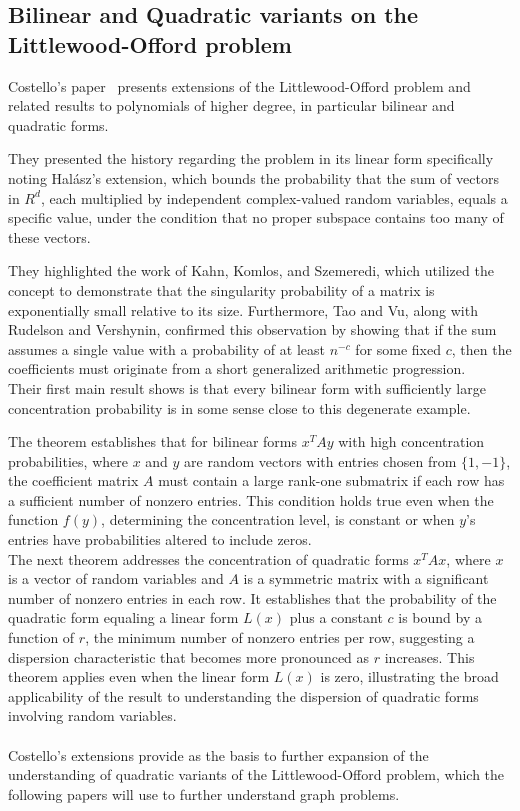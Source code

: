 \subsection{Bilinear and Quadratic variants on the Littlewood-Offord problem}

Costello's paper~\cite{costello2009bilinear} presents extensions of the Littlewood-Offord problem and related results to polynomials of higher degree, in particular bilinear and quadratic forms.

They presented the history regarding the problem in its linear form specifically noting Halász's extension, which bounds the probability that the sum of vectors in \(R^d\), each multiplied by independent complex-valued random variables, equals a specific value, under the condition that no proper subspace contains too many of these vectors.

They highlighted the work of Kahn, Komlos, and Szemeredi, which utilized the concept to demonstrate that the singularity probability of a matrix is exponentially small relative to its size. Furthermore, Tao and Vu, along with Rudelson and Vershynin, confirmed this observation by showing that if the sum assumes a single value with a probability of at least \(n^{-c}\) for some fixed \(c\), then the coefficients must originate from a short generalized arithmetic progression.\\

Their first main result shows is that every bilinear form with sufficiently large concentration probability is in some sense close to this degenerate example.

The theorem establishes that for bilinear forms \(x^T A y\) with high concentration probabilities, where \(x\) and \(y\) are random vectors with entries chosen from \(\{1, -1\}\), the coefficient matrix \(A\) must contain a large rank-one submatrix if each row has a sufficient number of nonzero entries. This condition holds true even when the function \(f(y)\), determining the concentration level, is constant or when \(y\)'s entries have probabilities altered to include zeros.\\

The next theorem addresses the concentration of quadratic forms \(x^T A x\), where \(x\) is a vector of random variables and \(A\) is a symmetric matrix with a significant number of nonzero entries in each row. It establishes that the probability of the quadratic form equaling a linear form \(L(x)\) plus a constant \(c\) is bound by a function of \(r\), the minimum number of nonzero entries per row, suggesting a dispersion characteristic that becomes more pronounced as \(r\) increases. This theorem applies even when the linear form \(L(x)\) is zero, illustrating the broad applicability of the result to understanding the dispersion of quadratic forms involving random variables.\\\\

Costello's extensions provide as the basis to further expansion of the understanding of quadratic variants of the Littlewood-Offord problem, which the following papers will use to further understand graph problems.
